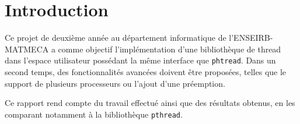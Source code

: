 \section*{Introduction}

Ce projet de deuxième année au département informatique de l'ENSEIRB-MATMECA a comme objectif l'implémentation d'une bibliothèque de thread dans l'espace utilisateur possédant la même interface que \texttt{phtread}. Dans un second temps, des fonctionnalités avancées doivent être proposées, telles que le support de plusieurs processeurs ou l'ajout d'une préemption.

Ce rapport rend compte du travail effectué ainsi que des résultats obtenus, en les comparant notamment à la bibliothèque \texttt{pthread}.

